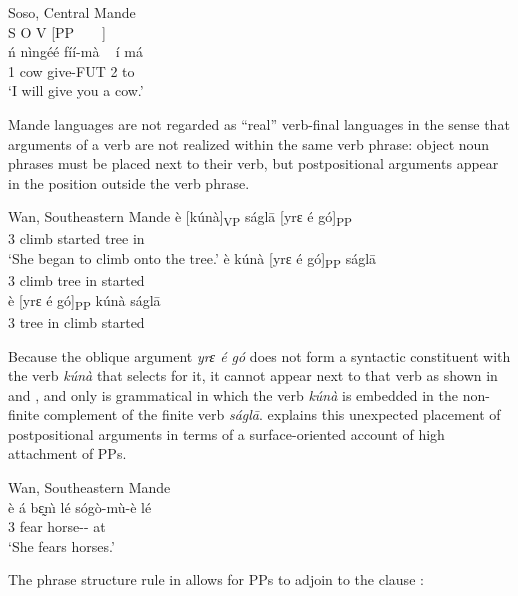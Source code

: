 \documentclass[output=paper,hidelinks]{langscibook}
\begin{document}
\ea\label{ex:African:33} Soso, Central Mande\\
\glll  S     O          V               [PP     ~ ~ ]\\
         ń nìngéé fíí-mà ~ í má\\
        1{\SG} cow      give-FUT   2{\SG}  to\\
    \glt ‘I will give you a cow.’
    \z

Mande languages are not regarded as “real” verb-final languages in the sense that arguments of a verb are not realized within the same verb phrase: object noun phrases must be placed next to their verb, but postpositional arguments appear in the position outside the verb phrase. 

\ea\label{ex:African:34}Wan, Southeastern Mande
\ea\label{ex:African:34a}
    \gll  è [kúnà]\textsubscript{VP}  ságlā [yrɛ é gó]\textsubscript{PP}\\
        3{\SG}     \phantom{[}climb      started    \phantom{[}tree  {\DEF} in  \\
    \glt ‘She began to climb onto the tree.’
\ex\label{ex:African:34b}
    \gll  *è kúnà [yrɛ é gó]\textsubscript{PP}  ságlā\\
        3{\SG}   climb    \phantom{[}tree   {\DEF} in        started \\
\ex\label{ex:African:34c}
    \gll  *è [yrɛ é gó]\textsubscript{PP}  kúnà ságlā\\
        3{\SG}   \phantom{[}tree  {\DEF} in       climb   started    \\
\z
\z

Because the oblique argument \textit{yrɛ é gó} does not form a syntactic constituent with the verb \textit{kúnà} that selects for it, it cannot appear next to that verb as shown in  and , and only  is grammatical in which the verb \textit{kúnà} is embedded in the non-finite complement of the finite verb \textit{ságlā}. \citet{Nikitina2019} explains this unexpected placement of postpositional arguments in terms of a surface-oriented account of high attachment of PPs. 

\ea\label{ex:African:35}Wan, Southeastern Mande\\
    \gll  \`e  á    bɛ̰n\`{\i}   lé      sóg\`{o}-m\`{u}-\`{e} lé\\
        3{\SG} {\PROG}  fear   {\PROG} horse-{\PL}-{\DEF} at \\
    \glt ‘She fears horses.’
    \z

The phrase structure rule in  allows for PPs to adjoin to the clause \citep{Nikitina2008,Nikitina:Mixing}:
\end{document}
